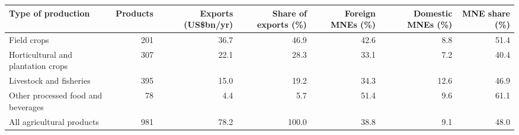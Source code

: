 \begin{tabular}{lrrrrrr}
\toprule
Type of production & Products & Exports (US\$bn/yr) & Share of exports (\%) & Foreign MNEs (\%) & Domestic MNEs (\%) & MNE share (\%) \\
\midrule
Field crops & 201 & 36.7 & 46.9 & 42.6 & 8.8 & 51.4 \\
Horticultural and plantation crops & 307 & 22.1 & 28.3 & 33.1 & 7.2 & 40.4 \\
Livestock and fisheries & 395 & 15.0 & 19.2 & 34.3 & 12.6 & 46.9 \\
Other processed food and beverages & 78 & 4.4 & 5.7 & 51.4 & 9.6 & 61.1 \\
\midrule
All agricultural products & 981 & 78.2 & 100.0 & 38.8 & 9.1 & 48.0 \\
\bottomrule
\end{tabular}

